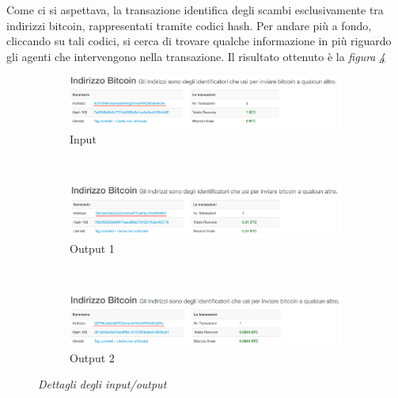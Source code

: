 Come ci si aspettava, la transazione identifica degli scambi esclusivamente tra indirizzi bitcoin, rappresentati tramite codici hash. Per andare più a fondo, cliccando su tali codici, si cerca di trovare qualche informazione in più riguardo gli agenti che intervengono nella transazione. Il risultato ottenuto è la \textit{figura \ref{fig:realtxdetails}}
\newline

\begin{figure}[htbp]
	\centering
	\begin{subfigure}[b]{0.8\textwidth}
		\includegraphics[width=\textwidth]{figure/realtxinput}
		\caption{Input}
		\label{fig:realtxinput}
	\end{subfigure}
	\\
	\begin{subfigure}[b]{0.8 \textwidth}
		\includegraphics[width=\textwidth]{figure/realtxoutput1}
		\caption{Output 1}
		\label{fig:realtxoutput1}
	\end{subfigure}
	\\
	\begin{subfigure}[b]{0.8 \textwidth}
		\includegraphics[width=\textwidth]{figure/realtxoutput2}
		\caption{Output 2}
		\label{fig:realtxoutput2}
	\end{subfigure}
	\caption{\textit{Dettagli degli input/output}}\label{fig:realtxdetails}
\end{figure}

